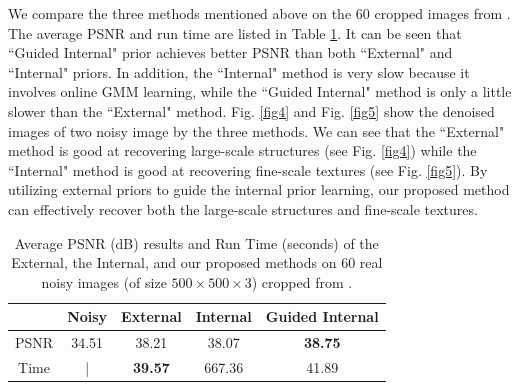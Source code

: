 \documentclass[10pt,twocolumn,letterpaper]{article}
\begin{document}
We compare the three methods mentioned above on the 60 cropped images from \cite{crosschannel2016}. The average PSNR and run time  are listed in Table \ref{tab1}. It can be seen that ``Guided Internal" prior achieves better PSNR than both ``External" and ``Internal" priors. In addition, the ``Internal" method is very slow because it involves online GMM learning, while the ``Guided Internal" method is only a little slower than the ``External" method. Fig. \ref{fig4} and Fig. \ref{fig5} show the denoised images of two noisy image by the three methods. We can see that the ``External" method is good at recovering large-scale structures (see Fig. \ref{fig4}) while the ``Internal" method is good at recovering fine-scale textures (see Fig. \ref{fig5}). By utilizing external priors to guide the internal prior learning, our proposed method can effectively recover both the large-scale structures and fine-scale textures. 

\begin{table}
\caption{Average PSNR (dB) results and Run Time (seconds) of the External, the Internal, and our proposed methods on 60 real noisy images (of size $500\times500\times3$) cropped from \cite{crosschannel2016}.}
\label{tab1}
\begin{small}
\vspace{-1mm}
\begin{center}
\renewcommand\arraystretch{1}
\begin{tabular}{|c||c|c|c|c|}
\hline
 & \textbf{Noisy} & \textbf{External} & \textbf{Internal} & \textbf{Guided Internal}  
\\
\hline
PSNR & 34.51 & 38.21 & 38.07 & \textbf{38.75} 
\\
\hline
Time & | &  \textbf{39.57}  & 667.36 & 41.89
\\
\hline
\end{tabular}
\end{center}\vspace{-4mm}
\end{small}
\end{table}
\end{document}
